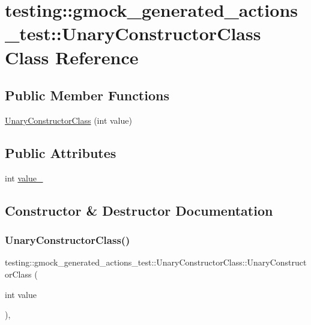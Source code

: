 \hypertarget{classtesting_1_1gmock__generated__actions__test_1_1UnaryConstructorClass}{}\section{testing\+::gmock\+\_\+generated\+\_\+actions\+\_\+test\+::Unary\+Constructor\+Class Class Reference}
\label{classtesting_1_1gmock__generated__actions__test_1_1UnaryConstructorClass}
\subsection*{Public Member Functions}
\begin{DoxyCompactItemize}
\item 
\mbox{\hyperlink{classtesting_1_1gmock__generated__actions__test_1_1UnaryConstructorClass_a35b2c0aab3928c1d558c11b6652a7262}{Unary\+Constructor\+Class}} (int value)
\end{DoxyCompactItemize}
\subsection*{Public Attributes}
\begin{DoxyCompactItemize}
\item 
int \mbox{\hyperlink{classtesting_1_1gmock__generated__actions__test_1_1UnaryConstructorClass_a5e96ce337c5eb7016eba2ea66ae46851}{value\+\_\+}}
\end{DoxyCompactItemize}


\subsection{Constructor \& Destructor Documentation}
\mbox{\label{classtesting_1_1gmock__generated__actions__test_1_1UnaryConstructorClass_a35b2c0aab3928c1d558c11b6652a7262}} 
\subsubsection{\texorpdfstring{UnaryConstructorClass()}{UnaryConstructorClass()}}
{\footnotesize\ttfamily testing\+::gmock\+\_\+generated\+\_\+actions\+\_\+test\+::\+Unary\+Constructor\+Class\+::\+Unary\+Constructor\+Class (\begin{DoxyParamCaption}\item[{int}]{value }\end{DoxyParamCaption})\hspace{0.3cm}{\ttfamily [inline]}, {\ttfamily [explicit]}}



